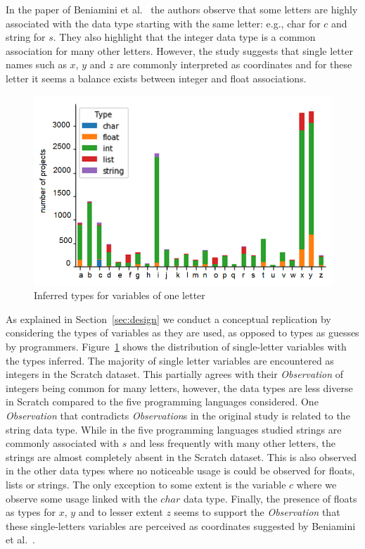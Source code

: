 \documentclass[conference]{IEEEtran}
\begin{document}
In the paper of Beniamini et al.~\cite{Beniamini} the authors observe that some letters are highly associated with the data type starting with the same letter: e.g., char for $c$ and string for $s$. They also highlight that the integer data type is a common association for many other letters. However, the study suggests that single letter names such as $x$, $y$ and $z$ are commonly interpreted as coordinates and for these letter it seems a balance exists between integer and float associations. 
\begin{figure}[h]
	\begin{center}
		\includegraphics[width=\columnwidth]{fig/project/one_letter_type_double}
		\caption{Inferred types for variables of one letter}
		\label{fig:one_letter_type}
	\end{center}
\end{figure} 
As explained in Section~\ref{sec:design} we conduct a conceptual replication by considering the types of variables as they are used, as opposed to types as guesses by programmers.
Figure~\ref{fig:one_letter_type} shows the distribution of single-letter variables with the types inferred. 
The majority of single letter variables are encountered as integers in the Scratch dataset. This partially agrees with their \emph{Observation} of integers being common for many letters, however, the data types  are less diverse in Scratch compared to the five programming languages considered.
One \emph{Observation} that contradicts \emph{Observation}s in the original study is related to the string data type. While in the five programming languages studied strings are commonly associated with $s$ and less frequently with many other letters, the strings are almost completely absent in the Scratch dataset. This is also observed in the other data types where no noticeable usage is could be observed for floats, lists or strings. The only exception to some extent is the variable $c$ where we observe some usage linked with the $char$ data type. 
Finally, the presence of floats as types for $x$, $y$ and to lesser extent $z$ seems to support the \emph{Observation} that these single-letters variables are perceived as coordinates suggested by Beniamini et al.~\cite{Beniamini}.
\end{document}
